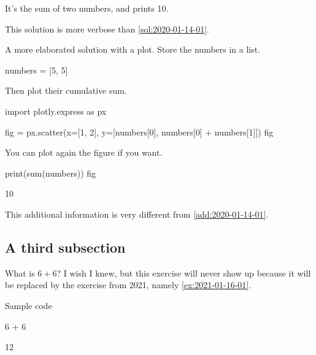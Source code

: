 \documentclass[oneside]{book}
\begin{document}
\begin{solution}
It's the sum of two numbers, and prints 10.

This solution is more verbose than \cref{sol:2020-01-14-01}.
\end{solution}

\begin{additionalinformation}
A more elaborated solution with a plot. Store the numbers in a list.

\begin{pycell}
numbers = [5, 5]
\end{pycell}

Then plot their cumulative sum.

\begin{pycell}
import plotly.express as px

fig = px.scatter(x=[1, 2], y=[numbers[0], numbers[0] + numbers[1]])
fig
\end{pycell}

You can plot again the figure if you want.

\begin{pycell}
print(sum(numbers))
fig
\end{pycell}
\begin{pyexpectedoutput}
10
\end{pyexpectedoutput}

This additional information is very different from \cref{add:2020-01-14-01}.
\end{additionalinformation}

\subsection{A third subsection}

\begin{exercise}[examdate={January 16, 2020}, examproblemnumber={1}, examproblemid={2020-01-16-01}, replacedbyexamproblemid={2021-01-16-01}, replacementsinceacademicyear={2025/2026}]
  What is \(6 + 6\)? I wish I knew, but this exercise will never show up because it will be replaced by the exercise from 2021, namely \cref{ex:2021-01-16-01}.

Sample code
\begin{pycell}
6 + 6
\end{pycell}
\begin{pyexpectedoutput}
12
\end{pyexpectedoutput}
\end{exercise}
\end{document}
